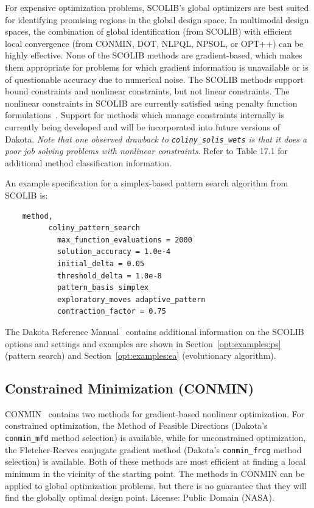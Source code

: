 For expensive optimization problems, SCOLIB's global optimizers are
best suited for identifying promising regions in the global design
space. In multimodal design spaces, the combination of global
identification (from SCOLIB) with efficient local convergence (from
CONMIN, DOT, NLPQL, NPSOL, or OPT++) can be highly effective. None of
the SCOLIB methods are gradient-based, which makes them appropriate
for problems for which gradient information is unavailable or is of
questionable accuracy due to numerical noise. The SCOLIB methods
support bound constraints and nonlinear constraints, but not linear
constraints.  The nonlinear constraints in SCOLIB are currently
satisfied using penalty function formulations~\cite{Pon96}. Support
for methods which manage constraints internally is currently being
developed and will be incorporated into future versions of Dakota.
\emph{Note that one observed drawback to \texttt{coliny\_solis\_wets}
is that it does a poor job solving problems with nonlinear
constraints}.  Refer to Table 17.1 for additional method
classification information.

An example specification for a simplex-based pattern search algorithm
from SCOLIB is:
\begin{small}
\begin{verbatim}
    method,
          coliny_pattern_search
            max_function_evaluations = 2000
            solution_accuracy = 1.0e-4
            initial_delta = 0.05
            threshold_delta = 1.0e-8
            pattern_basis simplex
            exploratory_moves adaptive_pattern
            contraction_factor = 0.75
\end{verbatim}
\end{small}

The Dakota Reference Manual~\cite{RefMan} contains additional information
on the SCOLIB options and settings and examples are shown in 
Section~\ref{opt:examples:ps} (pattern search) and
Section~\ref{opt:examples:ea} (evolutionary algorithm).

\subsection{Constrained Minimization (CONMIN)}\label{opt:software:conmin}

CONMIN~\cite{Van78} contains two methods for gradient-based nonlinear
optimization. For constrained optimization, the Method of Feasible
Directions (Dakota's \texttt{conmin\_mfd} method selection) is
available, while for unconstrained optimization, the Fletcher-Reeves
conjugate gradient method (Dakota's \texttt{conmin\_frcg} method
selection) is available. Both of these methods are most efficient at
finding a local minimum in the vicinity of the starting point. The
methods in CONMIN can be applied to global optimization problems, but
there is no guarantee that they will find the globally optimal design
point.  License: Public Domain (NASA).

